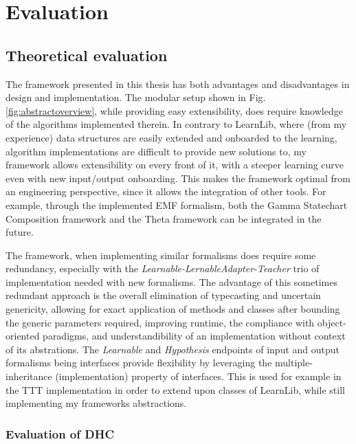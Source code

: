 \chapter{Evaluation}

\section{Theoretical evaluation}

The framework presented in this thesis has both advantages and disadvantages in design and implementation. The modular setup shown in Fig. \ref{fig:abstractoverview}, while providing easy extensibility, does require knowledge of the algorithms implemented therein. In contrary to LearnLib, where (from my experience) data structures are easily extended and onboarded to the learning, algorithm implementations are difficult to provide new solutions to, my framework allows extensibility on every front of it, with a steeper learning curve even with new input/output onboarding. This makes the framework optimal from an engineering perspective, since it allows the integration of other tools. For example, through the implemented EMF formalism, both the Gamma Statechart Composition framework\cite{DBLP:conf/icse/MolnarGVMV18} and the Theta framework\cite{theta-fmcad2017} can be integrated in the future.

The framework, when implementing similar formalisms does require some redundancy, especially with the \emph{Learnable-LernableAdapter-Teacher} trio of implementation needed with new formalisms. The advantage of this sometimes redundant approach is the overall elimination of typecasting and uncertain genericity, allowing for exact application of methods and classes after bounding the generic parameters required, improving runtime, the compliance with object-oriented paradigms, and understandibility of an implementation without context of its abstrations. The \emph{Learnable} and \emph{Hypothesis} endpoints of input and output formalisms being interfaces provide flexibility by leveraging the multiple-inheritance (implementation) property of interfaces. This is used for example in the TTT implementation in order to extend upon classes of LearnLib, while still implementing my frameworks abstractions.

\subsection{Evaluation of DHC}

